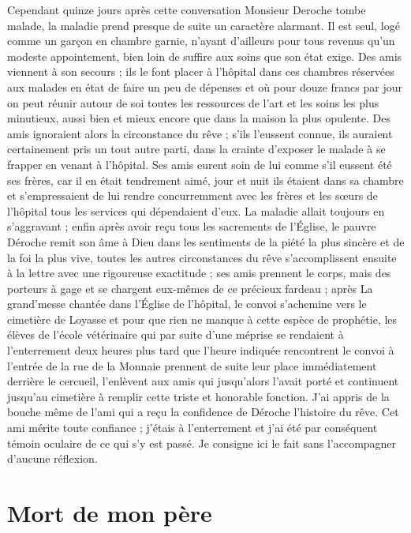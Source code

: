 \documentclass[11pt,a4paper]{report}
\begin{document}
Cependant quinze jours après cette conversation Monsieur Deroche tombe malade, la maladie prend presque de suite un caractère alarmant. Il est seul, logé comme un garçon en chambre garnie, n'ayant d'ailleurs pour tous revenus qu'un modeste appointement, bien loin de suffire aux soins que son état exige. Des amis viennent à son secours ; ils le font placer à l'hôpital dans ces chambres réservées aux malades en état de faire un peu de dépenses et où pour douze francs par jour on peut réunir autour de soi toutes les ressources de l'art et les soins les plus minutieux, aussi bien et mieux encore que dans la maison la plus opulente. Des amis ignoraient alors la circonstance du rêve ; s'ils l'eussent connue, ils auraient certainement pris un tout autre parti, dans la crainte d'exposer le malade à se frapper en venant à l'hôpital. Ses amis eurent soin de lui comme s'il eussent été ses frères, car il en était tendrement aimé, jour et nuit ils étaient dans sa chambre et s'empressaient de lui rendre concurremment avec les frères et les sœurs de l'hôpital tous les services qui dépendaient d'eux. La maladie allait toujours en s'aggravant ; enfin après avoir reçu tous les sacrements de l'Église, le pauvre Déroche remit son âme à Dieu dans les sentiments de la piété la plus sincère et de la foi la plus vive, toutes les autres circonstances du rêve s'accomplissent ensuite à la lettre avec une rigoureuse exactitude ; ses amis prennent le corps, mais des porteurs à gage et se chargent eux-mêmes de ce précieux fardeau ; après La grand'messe chantée dans l'Église de l'hôpital, le convoi s'achemine vers le cimetière de Loyasse et pour que rien ne manque à cette espèce de prophétie, les élèves de l'école vétérinaire qui par suite d'une méprise se rendaient à l'enterrement deux heures plus tard que l'heure indiquée rencontrent le convoi à l'entrée de la rue de la Monnaie prennent de suite leur place immédiatement derrière le cercueil, l'enlèvent aux amis qui jusqu'alors l'avait porté et continuent jusqu'au cimetière à remplir cette triste et honorable fonction. J'ai appris de la bouche même de l'ami qui a reçu la confidence de Déroche l'histoire du rêve. Cet ami mérite toute confiance ; j'étais à l'enterrement et j'ai été par conséquent témoin oculaire de ce qui s'y est passé. Je consigne ici le fait sans l'accompagner d'aucune réflexion.

\section*{Mort de mon père}
\end{document}
